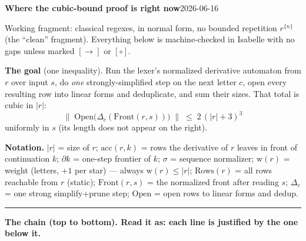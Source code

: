 \documentclass[11pt]{article}
\newcommand{\rs}[1]{\lvert #1\rvert}                  %
\newcommand{\norm}[1]{\lVert #1\rVert}                %
\newcommand{\acc}{\mathrm{acc}}                       %
\newcommand{\front}{\partial}                          %
\newcommand{\seqn}{\sigma}                             %
\newcommand{\zw}{\mathrm{w}}                           %
\newcommand{\Rows}{\mathrm{Rows}}                      %
\newcommand{\Front}{\mathrm{Front}}                    %
\newcommand{\Strong}{\Delta}                           %
\newcommand{\Open}{\mathrm{Open}}                      %
\begin{document}
{\large\textbf{Where the cubic-bound proof is right now}}\hfill\textsf{\small 2026-06-16}

\medskip
Working fragment: classical regexes, in normal form, no bounded repetition
$r^{\{n\}}$ (the ``clean'' fragment). Everything below is machine-checked in
Isabelle with no gaps unless marked $[\rightarrow]$ or $[\circ]$.

\bigskip
\textbf{The goal} (one inequality). Run the lexer's normalized derivative
automaton from $r$ over input $s$, do \emph{one} strongly-simplified step on the
next letter $c$, open every resulting row into linear forms and deduplicate,
and sum their sizes. That total is cubic in $\rs{r}$:
\[
\boxed{\;\norm{\;\Open\bigl(\Strong_c(\Front(r,s))\bigr)\;}\;\le\;2\,(\rs{r}+3)^3\;}
\]
uniformly in $s$ (its length does not appear on the right).

\bigskip
\textbf{Notation.} $\rs{r}$ = size of $r$;\;
$\acc(r,k)$ = rows the derivative of $r$ leaves in front of continuation $k$;\;
$\front k$ = one-step frontier of $k$;\;
$\seqn$ = sequence normalizer;\;
$\zw(r)$ = weight (letters, $+1$ per star) — always $\zw(r)\le\rs{r}$;\;
$\Rows(r)$ = all rows reachable from $r$ (static);\;
$\Front(r,s)$ = the normalized front after reading $s$;\;
$\Strong_c$ = one strong simplify+prune step;\;
$\Open$ = open rows to linear forms and dedup.

\bigskip
\hrule
\medskip
\textbf{The chain (top to bottom). Read it as: each line is justified by the one below it.}
\end{document}
